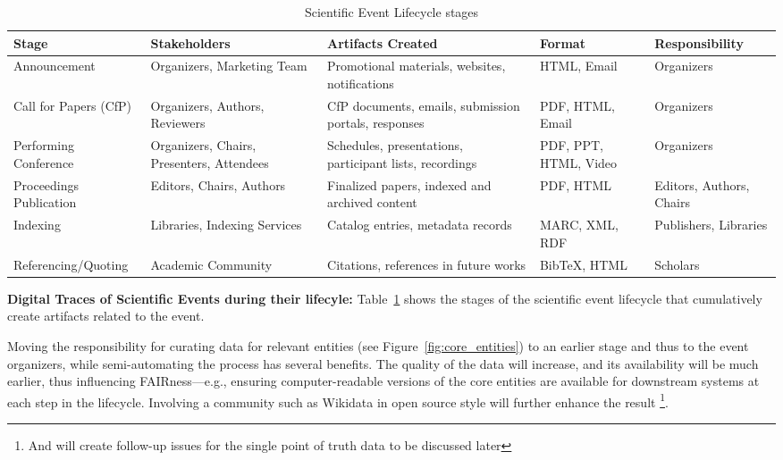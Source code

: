 \documentclass[runningheads]{llncs}
\begin{document}
\begin{table}
\caption{Scientific Event Lifecycle stages}
\label{tab:ScientificEventLifecycle}
\begin{tabular}{ | m{2.5cm} | m{2.5cm} | m{3.5cm} | m{2.5cm} | m{2.5cm} | }
\hline
\textbf{Stage} & \textbf{Stakeholders} & \textbf{Artifacts Created} & \textbf{Format} & \textbf{Responsibility} \\
\hline
Announcement & Organizers, Marketing Team & Promotional materials, websites, notifications & HTML, Email & Organizers \\
\hline
Call for Papers (CfP) & Organizers, Authors, Reviewers & CfP documents, emails, submission portals, responses & PDF, HTML, Email & Organizers \\
\hline
Performing Conference & Organizers, Chairs, Presenters, Attendees & Schedules, presentations, participant lists, recordings & PDF, PPT, HTML, Video & Organizers \\
\hline
Proceedings Publication & Editors, Chairs, Authors& Finalized papers, indexed and archived content & PDF, HTML & Editors, Authors, Chairs \\
\hline
Indexing & Libraries, Indexing Services & Catalog entries, metadata records & MARC, XML, RDF & Publishers, Libraries  \\
\hline
Referencing/Quoting & Academic Community & Citations, references in future works & BibTeX, HTML & Scholars \\

\hline
\end{tabular}
\end{table}

\textbf{Digital Traces of Scientific Events during their lifecyle:} Table~\ref{tab:ScientificEventLifecycle} shows the stages of the scientific event lifecycle that cumulatively create artifacts related to the event.

Moving the responsibility for curating data for relevant entities (see Figure~\ref{fig:core_entities}) to an earlier stage and thus to the event organizers, while semi-automating the process has several benefits. The quality of the data will increase, and its availability will be much earlier, thus influencing FAIRness---e.g., ensuring computer-readable versions of the core entities are available for downstream systems at each step in the lifecycle. Involving a community such as Wikidata in open source style will further enhance the result \footnote{And will create follow-up issues for the single point of truth data to be discussed later}.
\end{document}
